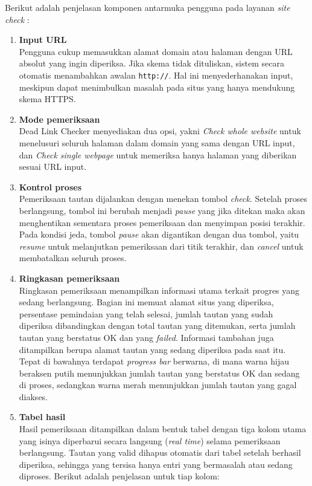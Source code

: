 Berikut adalah penjelasan komponen antarmuka pengguna pada layanan \textit{site check} :
\begin{enumerate}
    \item \textbf{Input URL}\\  
    Pengguna cukup memasukkan alamat domain atau halaman dengan URL absolut yang ingin diperiksa. Jika skema tidak dituliskan, sistem secara otomatis menambahkan awalan \texttt{http://}. Hal ini menyederhanakan input, meskipun dapat menimbulkan masalah pada situs yang hanya mendukung skema HTTPS.  

    \item \textbf{Mode pemeriksaan}\\  
    Dead Link Checker menyediakan dua opsi, yakni \textit{Check whole website} untuk menelusuri seluruh halaman dalam domain yang sama dengan URL input, dan \textit{Check single webpage} untuk memeriksa hanya halaman yang diberikan sesuai URL input.
 
    \item \textbf{Kontrol proses}\\
    Pemeriksaan tautan dijalankan dengan menekan tombol \textit{check}. Setelah proses berlangsung, tombol ini berubah menjadi \textit{pause} yang jika ditekan maka akan menghentikan sementara proses pemeriksaan dan menyimpan posisi terakhir. Pada kondisi jeda, tombol \textit{pause} akan digantikan dengan dua tombol, yaitu \textit{resume} untuk melanjutkan pemeriksaan dari titik terakhir, dan \textit{cancel} untuk membatalkan seluruh proses.

    \item \textbf{Ringkasan pemeriksaan}\\  
    Ringkasan pemeriksaan menampilkan informasi utama terkait progres yang sedang berlangsung. Bagian ini memuat alamat situs yang diperiksa, persentase pemindaian yang telah selesai, jumlah tautan yang sudah diperiksa dibandingkan dengan total tautan yang ditemukan, serta jumlah tautan yang berstatus OK dan yang \textit{failed}. Informasi tambahan juga ditampilkan berupa alamat tautan yang sedang diperiksa pada saat itu. Tepat di bawahnya terdapat \textit{progress bar} berwarna, di mana warna hijau beraksen putih menunjukkan jumlah tautan yang berstatus OK dan sedang di proses, sedangkan warna merah menunjukkan jumlah tautan yang gagal diakses.

    \item \textbf{Tabel hasil}\\
    Hasil pemeriksaan ditampilkan dalam bentuk tabel dengan tiga kolom utama yang isinya diperbarui secara langsung (\textit{real time}) selama pemeriksaan berlangsung. Tautan yang valid dihapus otomatis dari tabel setelah berhasil diperiksa, sehingga yang tersisa hanya entri yang bermasalah atau sedang diproses. Berikut adalah penjelasan untuk tiap kolom:
    \begin{itemize}
    

\end{itemize}
\end{enumerate}
